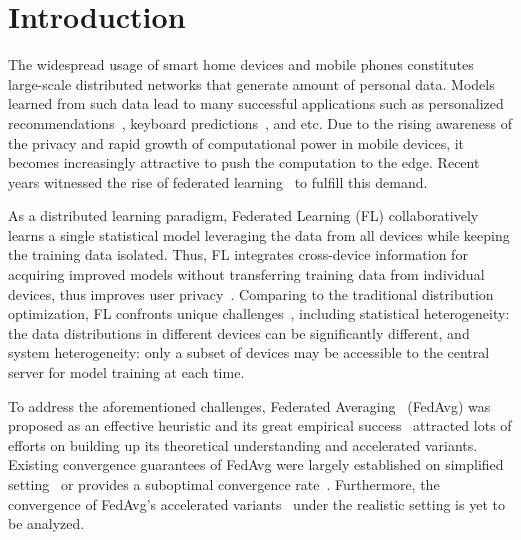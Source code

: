 

\section{Introduction}
The widespread usage of smart home devices and mobile phones constitutes
large-scale distributed networks that generate amount of personal data.
Models learned from such data lead to 
many successful applications such as personalized
recommendations~\cite{chen2018federated}, keyboard predictions~\cite{47586},
and etc. Due to the rising awareness of the privacy and rapid growth of
computational power in mobile devices, it becomes increasingly attractive to
push the computation to the edge. Recent years witnessed the rise of
federated learning~\cite{mcmahan2016communication} to fulfill this demand.

As a distributed learning paradigm, Federated Learning (FL) collaboratively
learns a single statistical model leveraging the data from all devices while
keeping the training data isolated.  Thus, FL integrates cross-device
information for acquiring improved models without transferring training data from individual devices, thus improves user
privacy~\cite{kairouz2019advances}. Comparing to the traditional distribution optimization,  FL confronts unique
challenges~\cite{li2019convergence,smith2017federated}, including statistical heterogeneity: the data distributions in different devices can be significantly different, and system heterogeneity: only a subset of devices may be accessible to the central server for model training at each time. 

To address the aforementioned challenges, Federated
Averaging~\cite{mcmahan2016communication} (FedAvg) was proposed as an
effective heuristic and its great empirical success~\cite{47586} attracted
lots of efforts on building up its theoretical understanding 
and accelerated variants. 
Existing convergence guarantees of FedAvg were largely established on simplified setting~\cite{stich2018local,khaled2019first,wang2018cooperative,yu2019parallel} or provides a suboptimal 
convergence rate~\cite{li2019convergence}. Furthermore, the convergence of
FedAvg's accelerated variants~\cite{yu2019linear,huo2020faster,liu2019accelerating} under the realistic setting is yet to be analyzed.



